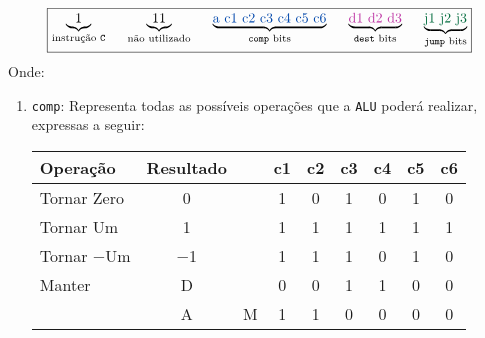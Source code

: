 \documentclass{article}
\begin{document}
\begin{enumerate}[noitemsep]
\begin{equation}
                            \boxed{
                            \underbrace{1}_{
                                    \text{instrução \texttt{C}}
                                }
                                \hspace{5mm}
                                \underbrace{11}_{
                                    \text{não utilizado}
                                }
                                \hspace{5mm}
                                \underbrace{\textcolor{darkblue}{\text{a c1 c2 c3 c4 c5 c6}}}_{
                                    \text{\texttt{comp} bits}
                                }
                                \hspace{5mm}
                                \underbrace{\textcolor{darkpurple}{\text{d1 d2 d3}}}_{
                                    \text{\texttt{dest} bits}
                                }
                                \hspace{5mm}
                                \underbrace{\textcolor{darkgreen}{\text{j1 j2 j3}}}_{
                                    \text{\texttt{jump} bits}
                                }
                            }
                        \end{equation}
                    Onde:
                        \begin{enumerate}
                            \item \texttt{comp}: Representa todas as possíveis operações que a \texttt{ALU} poderá realizar, expressas a seguir:
                                \begin{table}[H]
                                    \centering
                                    \begin{tabular}[]{l|cc|cccccc}\hline
                                        Operação     & Resultado  &            & c1& c2& c3& c4& c5&c6\\\hline
                                        Tornar Zero  & 0          &            & 1 & 0 & 1 & 0 & 1 & 0\\
                                        Tornar Um    & 1          &            & 1 & 1 & 1 & 1 & 1 & 1\\
                                        Tornar $-$Um & $-$1       &            & 1 & 1 & 1 & 0 & 1 & 0\\
                                        Manter       & D          &            & 0 & 0 & 1 & 1 & 0 & 0\\
                                                     & A          &  M         & 1 & 1 & 0 & 0 & 0 & 0\\

\end{tabular}
\end{table}
\end{enumerate}
\end{enumerate}
\end{document}
